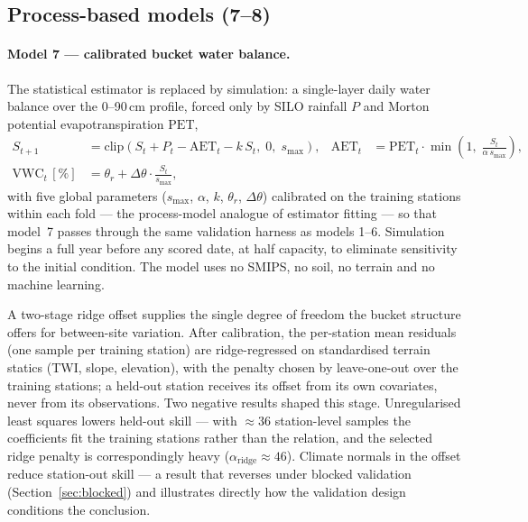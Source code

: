\documentclass[11pt,a4paper]{article}
\begin{document}
\subsection{Process-based models (7--8)}\label{sec:proctrack}

\paragraph{Model 7 --- calibrated bucket water balance.} The statistical
estimator is replaced by simulation: a single-layer daily water balance over
the 0--90\,cm profile, forced only by SILO rainfall $P$ and Morton potential
evapotranspiration $\mathrm{PET}$,
\begin{align}
S_{t+1} &= \mathrm{clip}\!\left(S_t + P_t - \mathrm{AET}_t - k\,S_t,\; 0,\; s_{\max}\right),
&
\mathrm{AET}_t &= \mathrm{PET}_t \cdot \min\!\left(1,\; \frac{S_t}{\alpha\, s_{\max}}\right),
\label{eq:bucket}\\
\mathrm{VWC}_t\,[\%] &= \theta_r + \Delta\theta \cdot \frac{S_t}{s_{\max}},
\label{eq:readout}
\end{align}
with five global parameters ($s_{\max}$, $\alpha$, $k$, $\theta_r$,
$\Delta\theta$) calibrated on the training stations within each fold --- the
process-model analogue of estimator fitting --- so that model~7 passes through
the same validation harness as models 1--6. Simulation begins a full year
before any scored date, at half capacity, to eliminate sensitivity to the
initial condition. The model uses no SMIPS, no soil, no terrain and no machine
learning.

A two-stage ridge offset supplies the single degree of freedom the bucket
structure offers for between-site variation. After calibration, the
per-station mean residuals (one sample per training station) are
ridge-regressed on standardised terrain statics (TWI, slope, elevation), with
the penalty chosen by leave-one-out over the training stations; a held-out
station receives its offset from its own covariates, never from its
observations. Two negative results shaped this stage. Unregularised least
squares lowers held-out skill --- with ${\approx}36$ station-level samples the
coefficients fit the training stations rather than the relation, and the
selected ridge penalty is correspondingly heavy ($\alpha_{\mathrm{ridge}}
\approx 46$). Climate normals in the offset reduce station-out skill --- a
result that reverses under blocked validation (Section~\ref{sec:blocked}) and
illustrates directly how the validation design conditions the conclusion.
\end{document}
